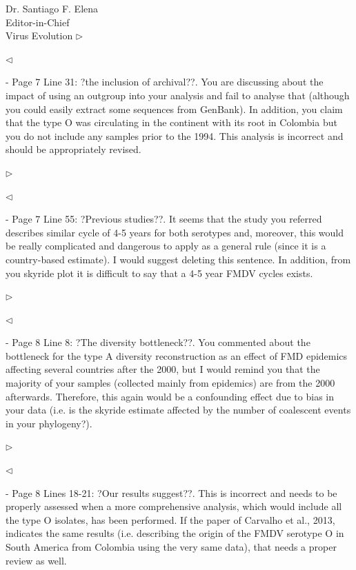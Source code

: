 \documentclass[ucla,biomath,12pt,noaddrfooter,datefrom]{UC_letter}
\newenvironment{reply}{$\triangleright$\bf}{$\triangleleft$}
\begin{document}
\begin{letter}{
Dr. Santiago F. Elena \\
Editor-in-Chief \\
Virus Evolution
}
\begin{reply}

\end{reply}

-       Page 7 Line 31: ?the inclusion of archival??. 
You are discussing about the impact of using an outgroup into your analysis and fail to analyse that (although you could easily extract some sequences from GenBank). 
In addition, you claim that the type O was circulating in the continent with its root in Colombia but you do not include any samples prior to the 1994. 
This analysis is incorrect and should be appropriately revised.

\begin{reply}

\end{reply}

-       Page 7 Line 55: ?Previous studies??. 
It seems that the study you referred describes similar cycle of 4-5 years for both serotypes and, moreover, this would be really complicated and dangerous to apply as a general rule (since it is a country-based estimate). 
I would suggest deleting this sentence. In addition, from you skyride plot it is difficult to say that a 4-5 year FMDV cycles exists.

\begin{reply}

\end{reply}

-       Page 8 Line 8: ?The diversity bottleneck??. 
You commented about the bottleneck for the type A diversity reconstruction as an effect of FMD epidemics affecting several countries after the 2000, but I would remind you that the majority of your samples (collected mainly from epidemics) are from the 2000 afterwards. 
Therefore, this again would be a confounding effect due to bias in your data (i.e. is the skyride estimate affected by the number of coalescent events in your phylogeny?).

\begin{reply}

\end{reply}

-       Page 8 Lines 18-21: ?Our results suggest??. 
This is incorrect and needs to be properly assessed when a more comprehensive analysis, which would include all the type O isolates, has been performed. 
If the paper of Carvalho et al., 2013, indicates the same results (i.e. describing the origin of the FMDV serotype O in South America from Colombia using the very same data), that needs a proper review as well.


\end{letter}
\end{document}
